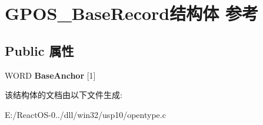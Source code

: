 \hypertarget{struct_g_p_o_s___base_record}{}\section{G\+P\+O\+S\+\_\+\+Base\+Record结构体 参考}
\label{struct_g_p_o_s___base_record}
\subsection*{Public 属性}
\begin{DoxyCompactItemize}
\item 
\mbox{\label{struct_g_p_o_s___base_record_af9290ddbc7af9bd6bbdd2ecb1721475d}} 
W\+O\+RD {\bfseries Base\+Anchor} \mbox{[}1\mbox{]}
\end{DoxyCompactItemize}


该结构体的文档由以下文件生成\+:\begin{DoxyCompactItemize}
\item 
E\+:/\+React\+O\+S-\/0../dll/win32/usp10/opentype.\+c\end{DoxyCompactItemize}
